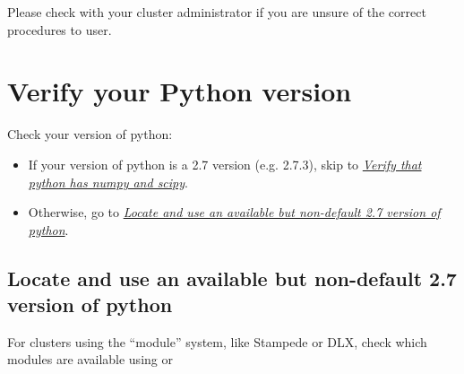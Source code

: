 \documentclass[letterpaper,10pt,english]{sphinxmanual}
\begin{document}
Please check with your cluster administrator if you are unsure of the correct procedures to user.


\section{Verify your Python version}
\label{1_0_installation:verify-your-python-version}
Check your version of python: 
\begin{itemize}
\item {} 
If your version of python is a 2.7 version (e.g. 2.7.3), skip to {\hyperref[1_0_installation:verify-numpy-scipy]{\emph{Verify that python has numpy and scipy}}}.

\item {} 
Otherwise, go to {\hyperref[1_0_installation:locate-other-python]{\emph{Locate and use an available but non-default 2.7 version of python}}}.

\end{itemize}


\subsection{Locate and use an available but non-default 2.7 version of python}
\label{1_0_installation:locate-and-use-an-available-but-non-default-2-7-version-of-python}\label{1_0_installation:locate-other-python}
For clusters using the ``module'' system, like Stampede or DLX, check which modules are available using  or 
\end{document}

